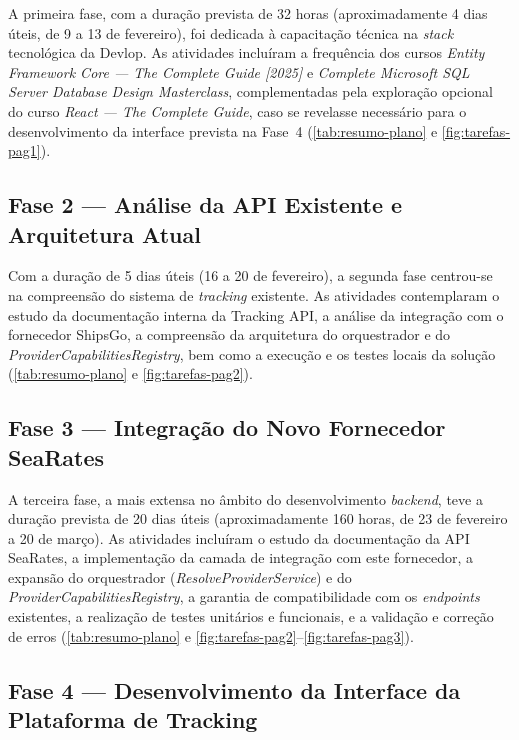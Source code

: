 \documentclass[a4paper,12pt]{report}
\begin{document}
A primeira fase, com a duração prevista de 32 horas (aproximadamente 4 dias úteis, de 9 a 13 de fevereiro), foi dedicada à capacitação técnica na \textit{stack} tecnológica da Devlop. As atividades incluíram a frequência dos cursos \textit{Entity Framework Core --- The Complete Guide [2025]} e \textit{Complete Microsoft SQL Server Database Design Masterclass}, complementadas pela exploração opcional do curso \textit{React --- The Complete Guide}, caso se revelasse necessário para o desenvolvimento da interface prevista na Fase~4 (\autoref{tab:resumo-plano} e \autoref{fig:tarefas-pag1}).

\subsection{Fase 2 --- Análise da API Existente e Arquitetura Atual}

Com a duração de 5 dias úteis (16 a 20 de fevereiro), a segunda fase centrou-se na compreensão do sistema de \textit{tracking} existente. As atividades contemplaram o estudo da documentação interna da Tracking API, a análise da integração com o fornecedor ShipsGo, a compreensão da arquitetura do orquestrador e do \textit{ProviderCapabilitiesRegistry}, bem como a execução e os testes locais da solução (\autoref{tab:resumo-plano} e \autoref{fig:tarefas-pag2}).

\subsection{Fase 3 --- Integração do Novo Fornecedor SeaRates}

A terceira fase, a mais extensa no âmbito do desenvolvimento \textit{backend}, teve a duração prevista de 20 dias úteis (aproximadamente 160 horas, de 23 de fevereiro a 20 de março). As atividades incluíram o estudo da documentação da API SeaRates, a implementação da camada de integração com este fornecedor, a expansão do orquestrador (\textit{ResolveProviderService}) e do \textit{ProviderCapabilitiesRegistry}, a garantia de compatibilidade com os \textit{endpoints} existentes, a realização de testes unitários e funcionais, e a validação e correção de erros (\autoref{tab:resumo-plano} e \autoref{fig:tarefas-pag2}--\autoref{fig:tarefas-pag3}).

\subsection{Fase 4 --- Desenvolvimento da Interface da Plataforma de Tracking}
\end{document}
